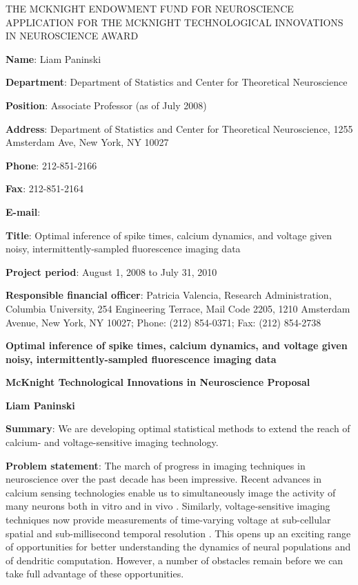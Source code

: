 \documentclass[12pt]{article}
\newcommand{\projecttitle}{Optimal inference of spike times, calcium dynamics,
and voltage given noisy, intermittently-sampled fluorescence imaging data}
\begin{document}
\pagestyle{plain}		%
\thispagestyle{empty}		%
\setcounter{page}{0}

\begin{center}
THE MCKNIGHT ENDOWMENT FUND FOR NEUROSCIENCE \\
APPLICATION FOR THE MCKNIGHT TECHNOLOGICAL INNOVATIONS IN NEUROSCIENCE AWARD
\end{center}

\vspace{1cm}

\textbf{Name}: Liam Paninski

\textbf{Department}: Department of Statistics and Center for Theoretical Neuroscience

\textbf{Position}: Associate Professor (as of July 2008)

\textbf{Address}: Department of Statistics and Center for Theoretical
Neuroscience, 1255 Amsterdam Ave, New York, NY 10027

\textbf{Phone}: 212-851-2166

\textbf{Fax}: 212-851-2164

\textbf{E-mail}: \email

\textbf{Title}: \projecttitle

\textbf{Project period}: August 1, 2008 to July 31, 2010

\textbf{Responsible financial officer}: Patricia Valencia, Research
Administration, Columbia University, 254 Engineering Terrace, Mail
Code 2205, 1210 Amsterdam Avenue, New York, NY 10027; Phone: (212)
854-0371; Fax: (212) 854-2738


\clearpage


\begin{center}
\textbf{\projecttitle}

\textbf{McKnight Technological Innovations in Neuroscience Proposal}

\textbf{Liam Paninski}
\end{center}

\noindent \textbf{Summary}: We are developing optimal statistical
methods to extend the reach of calcium- and voltage-sensitive imaging
technology.

\noindent \textbf{Problem statement}: The march of progress in imaging
techniques in neuroscience over the past decade has been impressive.
Recent advances in calcium sensing technologies enable us to
simultaneously image the activity of many neurons both in vitro and in
vivo \cite{CAR03,Kerr05,OhkiReid06,DombeckTank07}.  Similarly,
voltage-sensitive imaging techniques now provide measurements of
time-varying voltage at sub-cellular spatial and sub-millisecond
temporal resolution
\cite{Dombeck04,NURIYA06,Sacconi06,Canepari07,Fisher08,Djurisic08}.
This opens up an exciting range of opportunities for better
understanding the dynamics of neural populations and of dendritic
computation.  However, a number of obstacles remain before we can take
full advantage of these opportunities.
\end{document}
